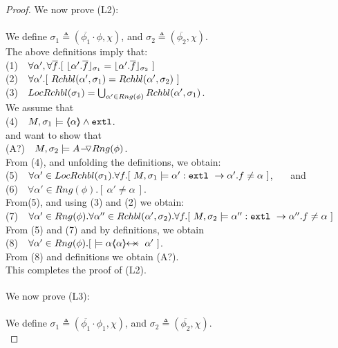 \begin{proof}
  We now prove (L2): \\
  ~ \\
 We define $\sigma_1 \triangleq (\overline {\phi_1}\cdot \phi,\chi)$, and  $\sigma_2 \triangleq (\overline {\phi_2},\chi) $.\\
The above definitions imply that: \\
\SP (1)\ \ $\forall \alpha',\forall \overline f.[\  \interpret {\sigma_1} {\alpha'.\overline f} =  \interpret {\sigma_2} {\alpha'.\overline f}\ ]$\\
\SP (2)\ \ $\forall \alpha'.[\  \Relevant {\alpha'} {\sigma_1} = \Relevant {\alpha'} {\sigma_2}\ ]$\\
\SP (3)\ \ $\LRelevantO {\sigma_1} = \bigcup_{\alpha'\in Rng(\phi)} \Relevant {\alpha'} {\sigma_1}$.\\
We   assume that\\
\SP (4)\ \  $M, \sigma_1 \models \inside \alpha \wedge \extThis$.\\
and want to show that\\
\SP (A?)\ \ $M, \sigma_2 \models \PushASLong  {Rng(\phi)} {A}$.\\
From (4), and unfolding the definitions, we obtain:\\
\SP (5)\ \  $\forall \alpha'\in \LRelevantO {\sigma_1}.\forall f.[ \   M, \sigma_1 \models \alpha':\prg{extl}\ \rightarrow \alpha'.f  \neq \alpha\ ]$, \ \ \ and\\
\SP (6)\ \ $\forall \alpha'\in Rng (\phi). [ \ \alpha'\neq \alpha \ ]$.\\
From(5), and using (3) and (2) we obtain:
\\
\SP (7)\ \  $\forall \alpha'\in Rng(\phi).\forall \alpha'' \in\Relevant {\alpha'} {\sigma_2}.\forall f.[ \   M, \sigma_2 \models \alpha'':\prg{extl}\ \rightarrow \alpha''.f  \neq \alpha\ ]$\\
From (5) and (7) and by definitions, we obtain
\\
\SP (8)\ \  $\forall \alpha'\in Rng (\phi).[ \   \models \alpha \protectedFrom \alpha {\alpha'}\ ]$.\\
From (8) and definitions we obtain (A?).\\
This completes the proof of (L2). 
 \\
  $\strut ~ \ $\\
  We now prove (L3): \\
  ~ \\
 We define $\sigma_1 \triangleq (\overline {\phi_1}\cdot \phi_1,\chi)$, and  $\sigma_2 \triangleq (\overline {\phi_2},\chi) $.\\

\end{proof}
